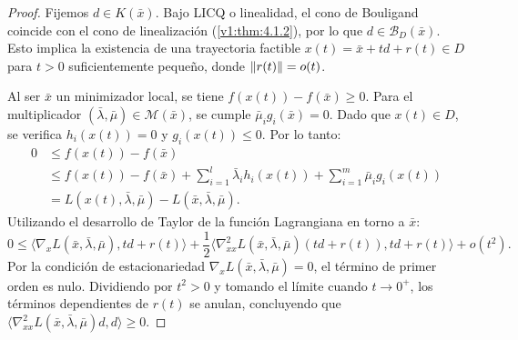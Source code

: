 \begin{proof}
 Fijemos $d \in K(\bar{x})$. Bajo LICQ o linealidad, el cono de Bouligand coincide con el cono de linealización (\cref{v1:thm:4.1.2}), por lo que $d \in \mathcal{B}_D(\bar{x})$. Esto implica la existencia de una trayectoria factible $x(t) = \bar{x} + td + r(t) \in D$ para $t > 0$ suficientemente pequeño, donde $\lVert r(t)\rVert = o(t)$.
 
 Al ser $\bar{x}$ un minimizador local, se tiene $f(x(t)) - f(\bar{x}) \ge 0$. Para el multiplicador $(\bar{\lambda}, \bar{\mu}) \in \mathcal{M}(\bar{x})$, se cumple $\bar{\mu}_i g_i(\bar{x}) = 0$. Dado que $x(t) \in D$, se verifica $h_i(x(t)) = 0$ y $g_i(x(t)) \le 0$. Por lo tanto:
 \[
 \begin{aligned}
 0 &\le f(x(t)) - f(\bar{x}) \\
 &\le f(x(t)) - f(\bar{x}) + \sum_{i=1}^l \bar{\lambda}_i h_i(x(t)) + \sum_{i=1}^m \bar{\mu}_i g_i(x(t)) \\
 &= L(x(t), \bar{\lambda}, \bar{\mu}) - L(\bar{x}, \bar{\lambda}, \bar{\mu}).
 \end{aligned}
 \]
 Utilizando el desarrollo de Taylor de la función Lagrangiana en torno a $\bar{x}$:
 \[
 0 \le \langle \nabla_x L(\bar{x}, \bar{\lambda}, \bar{\mu}), td + r(t) \rangle + \frac{1}{2} \langle \nabla_{xx}^2 L(\bar{x}, \bar{\lambda}, \bar{\mu})(td + r(t)), td + r(t) \rangle + o(t^2).
 \]
 Por la condición de estacionariedad $\nabla_x L(\bar{x}, \bar{\lambda}, \bar{\mu}) = 0$, el término de primer orden es nulo. Dividiendo por $t^2 > 0$ y tomando el límite cuando $t \to 0^+$, los términos dependientes de $r(t)$ se anulan, concluyendo que $\langle \nabla_{xx}^2 L(\bar{x}, \bar{\lambda}, \bar{\mu})d, d \rangle \ge 0$.
\end{proof}

